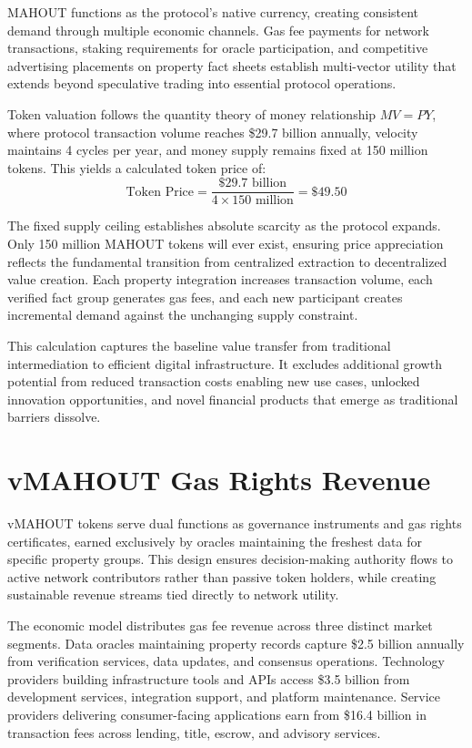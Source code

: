 MAHOUT functions as the protocol's native currency, creating consistent demand through multiple economic channels. Gas fee payments for network transactions, staking requirements for oracle participation, and competitive advertising placements on property fact sheets establish multi-vector utility that extends beyond speculative trading into essential protocol operations.

Token valuation follows the quantity theory of money relationship \(MV = PY\), where protocol transaction volume reaches \$29.7 billion annually, velocity maintains 4 cycles per year, and money supply remains fixed at 150 million tokens. This yields a calculated token price of:
\[
\text{Token Price} = \frac{\$29.7 \text{ billion}}{4 \times 150 \text{ million}} = \$49.50
\]

The fixed supply ceiling establishes absolute scarcity as the protocol expands. Only 150 million MAHOUT tokens will ever exist, ensuring price appreciation reflects the fundamental transition from centralized extraction to decentralized value creation. Each property integration increases transaction volume, each verified fact group generates gas fees, and each new participant creates incremental demand against the unchanging supply constraint.

This calculation captures the baseline value transfer from traditional intermediation to efficient digital infrastructure. It excludes additional growth potential from reduced transaction costs enabling new use cases, unlocked innovation opportunities, and novel financial products that emerge as traditional barriers dissolve.

\section{vMAHOUT Gas Rights Revenue}

vMAHOUT tokens serve dual functions as governance instruments and gas rights certificates, earned exclusively by oracles maintaining the freshest data for specific property groups. This design ensures decision-making authority flows to active network contributors rather than passive token holders, while creating sustainable revenue streams tied directly to network utility.

The economic model distributes gas fee revenue across three distinct market segments. Data oracles maintaining property records capture \$2.5 billion annually from verification services, data updates, and consensus operations. Technology providers building infrastructure tools and APIs access \$3.5 billion from development services, integration support, and platform maintenance. Service providers delivering consumer-facing applications earn from \$16.4 billion in transaction fees across lending, title, escrow, and advisory services.

